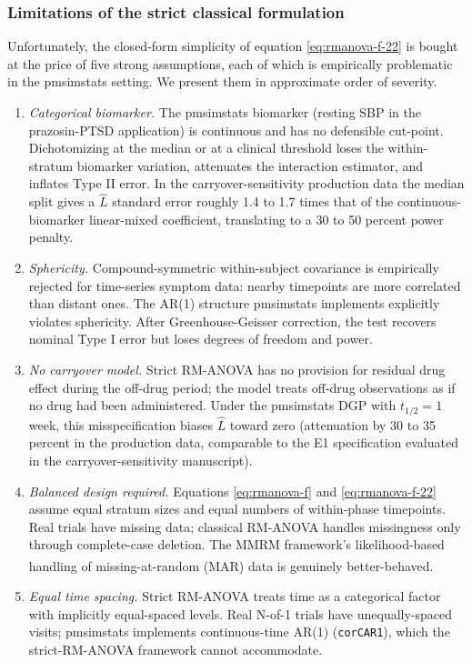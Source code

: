 \documentclass[
  11pt,
]{article}
\begin{document}
\subsubsection{Limitations of the strict classical formulation}\label{limitations-of-the-strict-classical-formulation}

Unfortunately, the closed-form simplicity of equation
\eqref{eq:rmanova-f-22} is bought at the price of five strong
assumptions, each of which is empirically problematic in the
pmsimstats setting. We present them in approximate order of
severity.

\begin{enumerate}
\def\labelenumi{\arabic{enumi}.}
\item
  \emph{Categorical biomarker.} The pmsimstats biomarker (resting
  SBP in the prazosin-PTSD application) is continuous and has
  no defensible cut-point. Dichotomizing at the median or at
  a clinical threshold loses the within-stratum biomarker
  variation, attenuates the interaction estimator, and
  inflates Type II error. In the carryover-sensitivity
  production data the median split gives a \(\hat L\) standard
  error roughly 1.4 to 1.7 times that of the continuous-
  biomarker linear-mixed coefficient, translating to a
  30 to 50 percent power penalty.
\item
  \emph{Sphericity.} Compound-symmetric within-subject covariance
  is empirically rejected for time-series symptom data:
  nearby timepoints are more correlated than distant ones.
  The AR(1) structure pmsimstats implements explicitly
  violates sphericity. After Greenhouse-Geisser correction,
  the test recovers nominal Type I error but loses degrees
  of freedom and power.
\item
  \emph{No carryover model.} Strict RM-ANOVA has no provision for
  residual drug effect during the off-drug period; the model treats
  off-drug observations as if no drug had been administered.
  Under the pmsimstats DGP with \(t_{1/2} = 1\) week, this
  misspecification biases \(\hat L\) toward zero (attenuation
  by 30 to 35 percent in the production data, comparable to
  the E1 specification evaluated in the carryover-sensitivity
  manuscript).
\item
  \emph{Balanced design required.} Equations
  \eqref{eq:rmanova-f} and \eqref{eq:rmanova-f-22} assume equal
  stratum sizes and equal numbers of within-phase timepoints.
  Real trials have missing data; classical RM-ANOVA handles
  missingness only through complete-case deletion. The MMRM
  framework's likelihood-based handling of missing-at-random (MAR)
  data\textsuperscript{} is genuinely
  better-behaved.
\item
  \emph{Equal time spacing.} Strict RM-ANOVA treats time as a
  categorical factor with implicitly equal-spaced levels.
  Real N-of-1 trials have unequally-spaced visits; pmsimstats
  implements continuous-time AR(1) (\texttt{corCAR1}), which the
  strict-RM-ANOVA framework cannot accommodate.
\end{enumerate}
\end{document}
